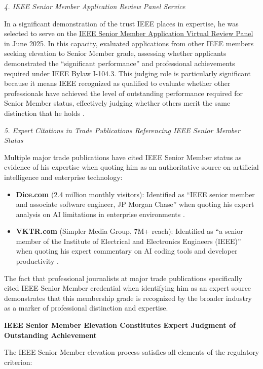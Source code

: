 \textit{4. IEEE Senior Member Application Review Panel Service}

In a significant demonstration of the trust IEEE places in \drs expertise, he was selected to serve on the \underline{IEEE Senior Member Application Virtual Review Panel} in June 2025. In this capacity, \dr evaluated applications from other IEEE members seeking elevation to Senior Member grade, assessing whether applicants demonstrated the ``significant performance'' and professional achievements required under IEEE Bylaw I-104.3. This judging role is particularly significant because it means IEEE recognized \dr as qualified to evaluate whether other professionals have achieved the level of outstanding performance required for Senior Member status, effectively judging whether others merit the same distinction that he holds \cite{JR11, JR12, JR13}.

\textit{5. Expert Citations in Trade Publications Referencing IEEE Senior Member Status}

Multiple major trade publications have cited \drs IEEE Senior Member status as evidence of his expertise when quoting him as an authoritative source on artificial intelligence and enterprise technology:

\begin{itemize}
    \item \textbf{Dice.com} (2.4 million monthly visitors): Identified \dr as ``IEEE senior member and associate software engineer, JP Morgan Chase'' when quoting his expert analysis on AI limitations in enterprise environments \cite{PM11}.
    \item \textbf{VKTR.com} (Simpler Media Group, 7M+ reach): Identified \dr as ``a senior member of the Institute of Electrical and Electronics Engineers (IEEE)'' when quoting his expert commentary on AI coding tools and developer productivity \cite{PM12}.
\end{itemize}

The fact that professional journalists at major trade publications specifically cited \drs IEEE Senior Member credential when identifying him as an expert source demonstrates that this membership grade is recognized by the broader industry as a marker of professional distinction and expertise.

\textbf{IEEE Senior Member Elevation Constitutes Expert Judgment of Outstanding Achievement}

The IEEE Senior Member elevation process satisfies all elements of the regulatory criterion:

